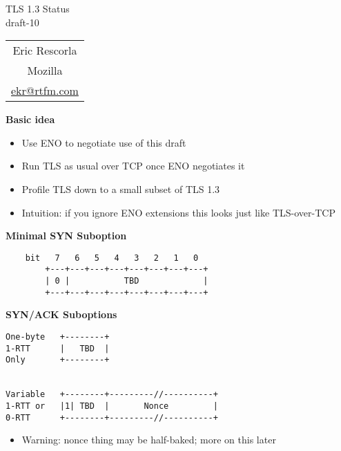 \documentclass[helvetica]{seminar}
\newcommand{\heading}[1]{%
  \begin{center} 
    \large\bf 
    #1 
  \end{center} 
  \vspace{.4 in}}
\begin{document}
\begin{slide}
\begin{center}
\vspace{.5 in}
\LARGE{{\bf}TLS 1.3 Status\\draft-10}\\
\vspace{.2in}
\large{
\begin{tabular}{c}
Eric Rescorla\\
Mozilla\\
\url{ekr@rtfm.com}
\end{tabular}
}
\end{center}

\end{slide}
\centerslidesfalse 

\begin{slide}
\heading{Basic idea}

\begin{itemize}
\item Use ENO to negotiate use of this draft
\item Run TLS as usual over TCP once ENO negotiates it
\item Profile TLS down to a small subset of TLS 1.3
\item Intuition: if you ignore ENO extensions this looks just like TLS-over-TCP
\end{itemize}

\end{slide}


\begin{slide}
\heading{Minimal SYN Suboption}

\begin{verbatim}
    bit   7   6   5   4   3   2   1   0
        +---+---+---+---+---+---+---+---+
        | 0 |           TBD             |
        +---+---+---+---+---+---+---+---+
\end{verbatim}
\end{slide}

\begin{slide}
\heading{SYN/ACK Suboptions}

\begin{verbatim}
One-byte   +--------+
1-RTT      |   TBD  |
Only       +--------+  


Variable   +--------+---------//----------+
1-RTT or   |1| TBD  |       Nonce         |
0-RTT      +--------+---------//----------+
\end{verbatim}

\begin{itemize}
\item Warning: nonce thing may be half-baked; more on this later
\end{itemize}
\end{slide}
\end{document}
